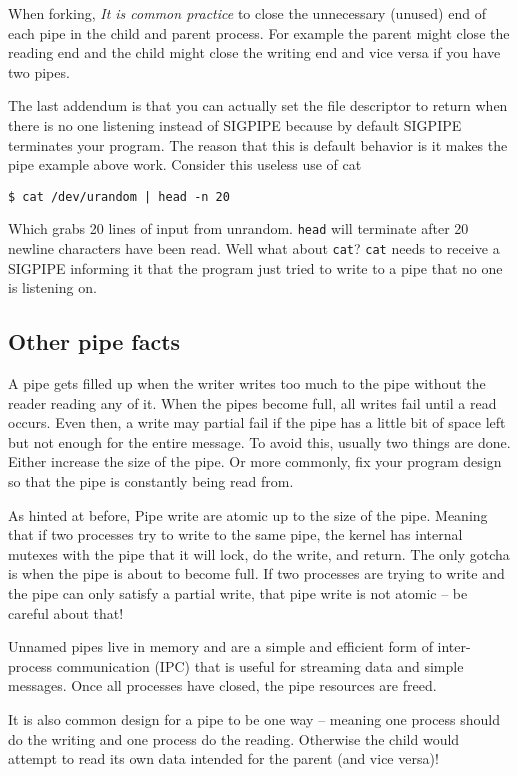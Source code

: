When forking, \emph{It is common practice} to close the unnecessary (unused) end of each pipe in the child and parent process. For example the parent might close the reading end and the child might close the writing end and vice versa if you have two pipes.

The last addendum is that you can actually set the file descriptor to return when there is no one listening instead of SIGPIPE because by default SIGPIPE terminates your program.
The reason that this is default behavior is it makes the pipe example above work.
Consider this useless use of cat

\begin{verbatim}
$ cat /dev/urandom | head -n 20
\end{verbatim}
Which grabs 20 lines of input from unrandom. \texttt{head} will terminate after 20 newline characters have been read. Well what about \texttt{cat}?
\texttt{cat} needs to receive a SIGPIPE informing it that the program just tried to write to a pipe that no one is listening on.

\subsection{Other pipe facts}

A pipe gets filled up when the writer writes too much to the pipe without the reader reading any of it. When the pipes become full, all writes fail until a read occurs. Even then, a write may partial fail if the pipe has a little bit of space left but not enough for the entire message. To avoid this, usually two things are done. Either increase the size of the pipe. Or more commonly, fix your program design so that the pipe is constantly being read from.

As hinted at before, Pipe write are atomic up to the size of the pipe. Meaning that if two processes try to write to the same pipe, the kernel has internal mutexes with the pipe that it will lock, do the write, and return. The only gotcha is when the pipe is about to become full. If two processes are trying to write and the pipe can only satisfy a partial write, that pipe write is not atomic -- be careful about that!

Unnamed pipes live in memory and are a simple and efficient form of inter-process communication (IPC) that is useful for streaming data and simple messages. Once all processes have closed, the pipe resources are freed.

It is also common design for a pipe to be one way -- meaning one process should do the writing and one process do the reading. Otherwise the child would attempt to read its own data intended for the parent (and vice versa)!

